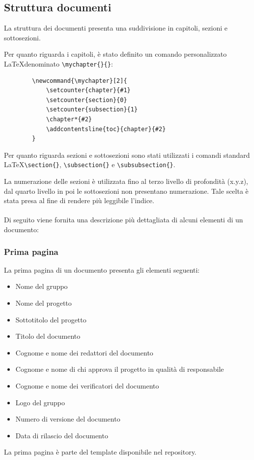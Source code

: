 \documentclass[a4paper]{report}
\newcommand{\mychapter}[2]{
	\setcounter{chapter}{#1}
	\setcounter{section}{0}
	\setcounter{subsection}{1}
	\chapter*{#2}
	\addcontentsline{toc}{chapter}{#2}
}
\begin{document}
	\subsection{Struttura documenti}
	La struttura dei documenti presenta una suddivisione in capitoli, sezioni e sottosezioni. 
	
	Per quanto riguarda i capitoli, è stato definito un comando personalizzato \LaTeX \space denominato
	\verb|\mychapter{}{}|:
	\begin{verbatim}
		\newcommand{\mychapter}[2]{
			\setcounter{chapter}{#1}
			\setcounter{section}{0}
			\setcounter{subsection}{1}
			\chapter*{#2}
			\addcontentsline{toc}{chapter}{#2}
		}
	\end{verbatim}
	Per quanto riguarda sezioni e sottosezioni sono stati utilizzati i comandi standard \LaTeX \space \verb|\section{}|, 
	\verb|\subsection{}| e \verb|\subsubsection{}|.

	La numerazione delle sezioni è utilizzata fino al terzo livello di profondità (x.y.z), dal quarto livello in poi le sottosezioni
	 non presentano numerazione. Tale scelta è stata presa al fine di rendere più leggibile l'indice.
	\\ \\
	Di seguito viene fornita una descrizione più dettagliata di alcuni elementi di un documento: 
	\subsubsection{Prima pagina}
	La prima pagina di un documento presenta gli elementi seguenti:
	\begin{itemize}
		\item Nome del gruppo
		\item Nome del progetto
		\item Sottotitolo del progetto
		\item Titolo del documento
		\item Cognome e nome dei redattori del documento
		\item Cognome e nome di chi approva il progetto in qualità di responsabile
		\item Cognome e nome dei verificatori del documento
		\item Logo del gruppo
		\item Numero di versione del documento
		\item Data di rilascio del documento
	\end{itemize}
	La prima pagina è parte del template disponibile nel repository. 
\end{document}
